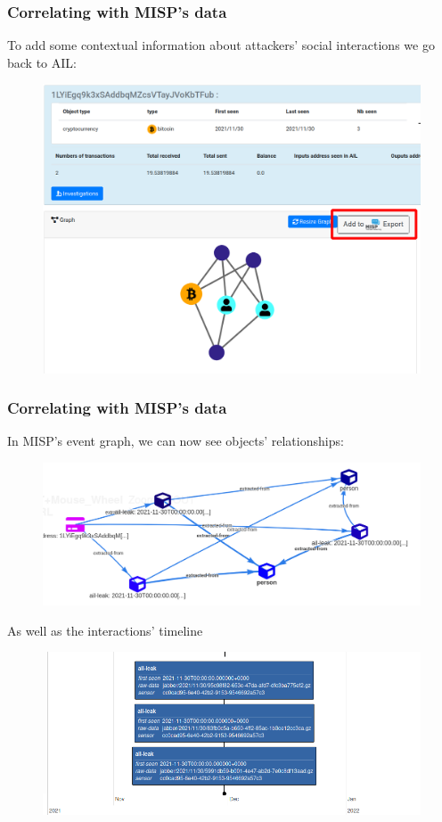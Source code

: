 \begin{frame}
    \frametitle{Correlating with MISP's data}
    To add some contextual information about attackers' social interactions we go back to AIL:
     \begin{figure}[t]
        \includegraphics[width=.75\textwidth]{pictures/contileaks-export-bitcoin.png}
        \centering
    \end{figure}
\end{frame}

\begin{frame}
    \frametitle{Correlating with MISP's data}
    In MISP's event graph, we can now see objects' relationships:
     \begin{figure}[t]
        \includegraphics[width=.70\textwidth]{pictures/contileaks-bitcoin-graph.png}
        \centering
    \end{figure}
    As well as the interactions' timeline

     \begin{figure}[t]
        \includegraphics[width=.72\textwidth]{pictures/contileaks-bitcoin-timeline.png}
        \centering
    \end{figure}
\end{frame}

